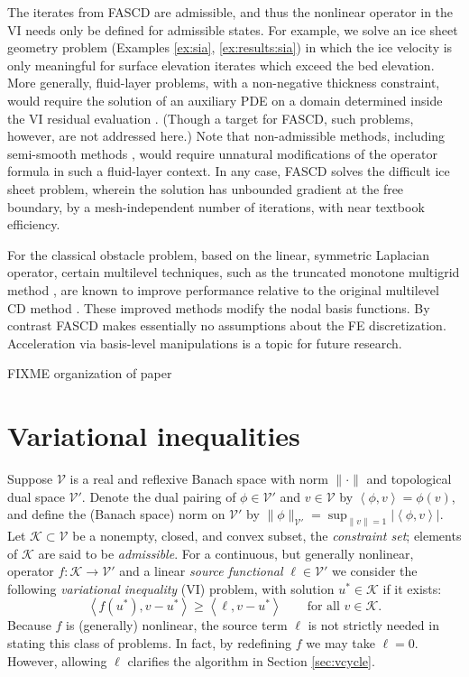 \documentclass[letterpaper,final,12pt,reqno]{amsart}
\theoremstyle{cstyle}
\theoremstyle{cstyle*}
\theoremstyle{dstyle}
\numberwithin{equation}{section}
\numberwithin{figure}{section}
\numberwithin{table}{section}
\numberwithin{theorem}{section}
\newcommand{\cK}{\mathcal{K}}
\newcommand{\cV}{\mathcal{V}}
\newcommand{\ip}[2]{\left<#1,#2\right>}
\begin{document}
The iterates from FASCD are admissible, and thus the nonlinear operator in the VI needs only be defined for admissible states.  For example, we solve an ice sheet geometry problem (Examples \ref{ex:sia}, \ref{ex:results:sia}) in which the ice velocity is only meaningful for surface elevation iterates which exceed the bed elevation.  More generally, fluid-layer problems, with a non-negative thickness constraint, would require the solution of an auxiliary PDE on a domain determined inside the VI residual evaluation \cite{Bueler2021conservation}.  (Though a target for FASCD, such problems, however, are not addressed here.)  Note that non-admissible methods, including semi-smooth methods \cite{BensonMunson2006}, would require unnatural modifications of the operator formula in such a fluid-layer context.  In any case, FASCD solves the difficult ice sheet problem, wherein the solution has unbounded gradient at the free boundary, by a mesh-independent number of iterations, with near textbook efficiency.

For the classical obstacle problem, based on the linear, symmetric Laplacian operator, certain multilevel techniques, such as the truncated monotone multigrid method \cite{GraeserKornhuber2009,Kornhuber1994}, are known to improve performance relative to the original multilevel CD method \cite{Tai2003}.  These improved methods modify the nodal basis functions.  By contrast FASCD makes essentially no assumptions about the FE discretization.  Acceleration via basis-level manipulations is a topic for future research.

FIXME organization of paper


\section{Variational inequalities} \label{sec:vi}

Suppose $\cV$ is a real and reflexive Banach space with norm $\|\cdot\|$ and topological dual space $\cV'$.  Denote the dual pairing of $\phi \in \cV'$ and $v\in\cV$ by $\ip{\phi}{v} = \phi(v)$, and define the (Banach space) norm on $\cV'$ by $\|\phi\|_{\cV'} = \sup_{\|v\|=1} |\ip{\phi}{v}|$.  Let $\cK \subset \cV$ be a nonempty, closed, and convex subset, the \emph{constraint set}; elements of $\cK$ are said to be \emph{admissible}.  For a continuous, but generally nonlinear, operator $f:\cK \to \cV'$ and a linear \emph{source functional} $\ell\in \cV'$ we consider the following \emph{variational inequality} (VI) problem, with solution $u^*\in \cK$ if it exists:
\begin{equation}
\ip{f(u^*)}{v-u^*} \ge \ip{\ell}{v-u^*} \qquad \text{for all } v\in \cK. \label{eq:vi}
\end{equation}
Because $f$ is (generally) nonlinear, the source term $\ell$ is not strictly needed in stating this class of problems.  In fact, by redefining $f$ we may take $\ell=0$.  However, allowing $\ell$ clarifies the algorithm in Section \ref{sec:vcycle}.
\end{document}
